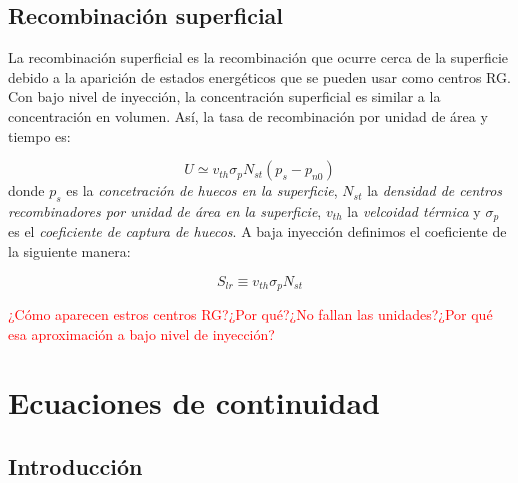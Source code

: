 \subsection{Recombinación superficial}

La recombinación superficial es la recombinación que ocurre cerca de la superficie debido a la aparición de estados energéticos que se pueden usar como centros RG. Con bajo nivel de inyección, la concentración superficial es similar a la concentración en volumen. Así, la tasa de recombinación por unidad de área y tiempo es:

\begin{equation}
	U  \simeq v_{th} \sigma_p N_{st} (p_s-p_{n0})
\end{equation}
donde $p_s$ es la \textit{concetración de huecos en la superficie}, $N_{st}$ la \textit{densidad de centros recombinadores por unidad de área en la superficie}, $v_{th}$ la \textit{velcoidad térmica} y $\sigma_p$ es el \textit{coeficiente de captura de huecos}. A baja inyección definimos el coeficiente de la siguiente manera:

\begin{equation}
	S_{lr} \equiv v_{th} \sigma_p N_{st}
\end{equation}

\begin{Anotacion}
	\textcolor{red}{¿Cómo aparecen estros centros RG?¿Por qué?¿No fallan las unidades?¿Por qué esa aproximación a bajo nivel de inyección?}
\end{Anotacion}



\section{Ecuaciones de continuidad}


\subsection{Introducción}

